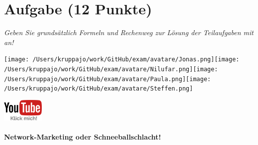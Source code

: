 \documentclass[a4paper, 9pt]{scrartcl}\usepackage[]{graphicx}\usepackage[]{xcolor}
\begin{document}
 
\clearpage

\section{Aufgabe \hfill (12 Punkte)}

\textit{Geben Sie grundsätzlich Formeln und Rechenweg zur Lösung der Teilaufgaben mit an!} \\[1Ex]
 

 
\ifcollection
\begin{flushright}
\tiny\vspace{-3Ex}
\textbf{\examinhaltstart}
\exammodulemathstat
\vspace{-4Ex}
\end{flushright}
\begin{minipage}[t]{0.5\textwidth}
\texttt{[image: /Users/kruppajo/work/GitHub/exam/avatare/Jonas.png]}\hspace{-4mm}\texttt{[image: /Users/kruppajo/work/GitHub/exam/avatare/Nilufar.png]}\hspace{-4mm}\texttt{[image: /Users/kruppajo/work/GitHub/exam/avatare/Paula.png]}\hspace{-4mm}\texttt{[image: /Users/kruppajo/work/GitHub/exam/avatare/Steffen.png]}
\end{minipage}
\begin{minipage}[t]{0.5\textwidth}
\hfill
\href{https://youtu.be/SZqp_vy3rgI}{\includegraphics[width = 2cm]{img/youtube}}
\end{minipage}
\fi



\ifcollection
\paragraph{Network-Marketing oder Schneeballschlacht!}
\fi
\end{document}
